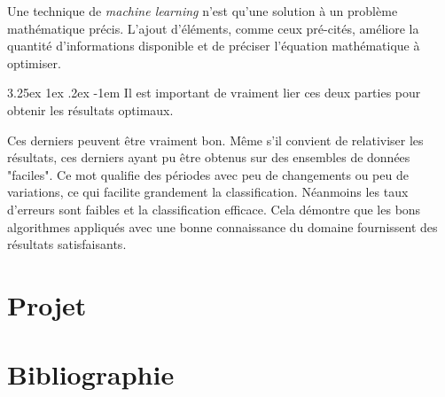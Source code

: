 \documentclass[a4paper, 11pt]{article}
\makeatletter
\renewcommand\paragraph{\@startsection{paragraph}{5}{\z@}%
  {3.25ex \@plus1ex \@minus.2ex}%
  {-1em}%
  {\normalfont\normalsize\bfseries}}
\makeatother
\begin{document}
Une technique de \textit{machine learning} n'est qu'une solution à un problème mathématique précis. L'ajout d'éléments, comme ceux pré-cités, améliore la quantité d'informations disponible et de préciser l'équation mathématique à optimiser.

\paragraph{}
Il est important de vraiment lier ces deux parties pour obtenir les résultats optimaux.

Ces derniers peuvent être vraiment bon. Même s'il convient de relativiser les résultats, ces derniers ayant pu être obtenus sur des ensembles de données "faciles". Ce mot qualifie des périodes avec peu de changements ou peu de variations, ce qui facilite grandement la classification.
Néanmoins les taux d'erreurs sont faibles et la classification efficace.
Cela démontre que les bons algorithmes appliqués avec une bonne connaissance du domaine fournissent des résultats satisfaisants. 



\newpage
\section{Projet}
\newpage
\section{Bibliographie}
\end{document}

